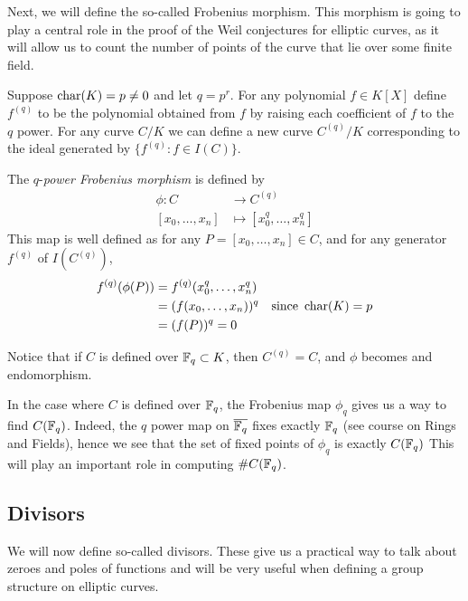 
Next, we will define the so-called Frobenius morphism.
This morphism is going to play a central role in the proof of the Weil
conjectures for elliptic curves, as it will allow us to count
the number of points of the curve that lie over some finite field.

\begin{definition}
	Suppose $\operatorname{char}(K) = p \neq 0$ and let $q = p^r$.
	For any polynomial $f \in K[X]$ define $f^{(q)}$ to be the polynomial
	obtained from $f$ by raising each coefficient of 
	$f$ to the $q$ power.
	For any curve $C/K$ we can define a new curve $C^{(q)}/K$ corresponding
	to the ideal generated by $\{f^{(q)}: f \in I(C)\}$.	

	The $q$-\emph{power Frobenius morphism} is defined by
	\begin{align*}
		\phi: C &\to C^{(q)}\\
		[x_0, \dots, x_n] &\mapsto [x_0^q, \dots, x_n^q]
	\end{align*}
	This map is well defined as for any $P = [x_0, \dots, x_n] \in C$, and
	for any generator $f^{(q)}$ of $I(C^{(q)})$,
	\begin{align*}
		f^{(q)}(\phi(P)) &= f^{(q)}(x_0^q, \dots, x_n^q)\\
		&= (f(x_0, \dots, x_n))^q&\textrm{since }\operatorname{char}(K) = p\\
		&= (f(P))^q = 0
	\end{align*}
	
	Notice that if
	$C$ is defined over $\mathbb{F}_q \subset K$, then $C^{(q)} = C$,
	and $\phi$ becomes and endomorphism.
\end{definition}

In the case where $C$ is defined over $\mathbb{F}_q$, the Frobenius map $\phi_q$
gives us a way to find $C(\mathbb{F}_q)$. Indeed, the $q$ power map
on $\overline{\mathbb{F}_q}$ fixes exactly $\mathbb{F}_q$ (see course on Rings and Fields),
hence we see that the set of fixed points of $\phi_q$ is exactly $C(\mathbb{F}_q)$
This will play an important role in computing $\#C(\mathbb{F}_q)$.

\subsection{Divisors}

We will now define so-called divisors. These give us a practical way
to talk about zeroes and poles of functions and will be very useful when
defining a group structure on elliptic curves.

